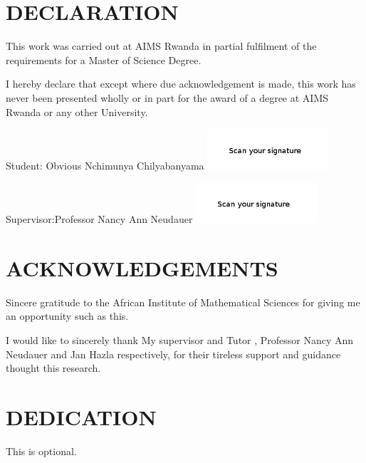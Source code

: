 \chapter*{DECLARATION}
This work was carried out at AIMS Rwanda in partial fulfilment of the requirements for a Master of Science Degree.

I hereby declare that except where due acknowledgement is made, this work has never been presented wholly or in part for the award of a degree at AIMS Rwanda or any other University.

\vspace{1.5cm}
Student: Obvious Nchimunya Chilyabanyama \includegraphics[height=1.5cm]{images/signature.png}

\vspace{1.5cm}

Supervisor:Professor Nancy Ann Neudauer  \includegraphics[height=1.5cm]{images/signature1.png}


\newpage

\chapter*{ACKNOWLEDGEMENTS}
Sincere gratitude to the African Institute of Mathematical Sciences for giving me an opportunity such as this.

I would like to sincerely thank My supervisor and Tutor , Professor Nancy Ann Neudauer and Jan Hazla respectively, for their tireless support and guidance thought this research.
 
\newpage
\chapter*{DEDICATION} 

This is optional.